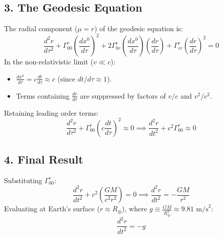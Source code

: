 \documentclass{article}
\begin{document}
	\subsection*{3. The Geodesic Equation}
	The radial component ($\mu = r$) of the geodesic equation is:
	\begin{equation}
		\frac{d^2 r}{d\tau^2} + \Gamma^r_{00} \left(\frac{dx^0}{d\tau}\right)^2 + 2\Gamma^r_{0r} \left(\frac{dx^0}{d\tau}\right)\left(\frac{dr}{d\tau}\right) + \Gamma^r_{rr}\left(\frac{dr}{d\tau}\right)^2 = 0
	\end{equation}
	In the non-relativistic limit ($v \ll c$):
	\begin{itemize}
		\item $\frac{dx^0}{d\tau} = c \frac{dt}{d\tau} \approx c$ (since $dt/d\tau \approx 1$).
		\item Terms containing $\frac{dr}{d\tau}$ are suppressed by factors of $v/c$ and $v^2/c^2$.
	\end{itemize}
	Retaining leading order terms:
	\begin{equation}
		\frac{d^2 r}{d\tau^2} + \Gamma^r_{00} \left(c \frac{dt}{d\tau}\right)^2 \approx 0 \implies \frac{d^2 r}{dt^2} + c^2 \Gamma^r_{00} \approx 0
	\end{equation}
	
	\subsection*{4. Final Result}
	Substituting $\Gamma^r_{00}$:
	\begin{equation}
		\frac{d^2 r}{dt^2} + c^2 \left( \frac{GM}{c^2 r^2} \right) = 0 \implies \frac{d^2 r}{dt^2} = -\frac{GM}{r^2}
	\end{equation}
	Evaluating at Earth's surface ($r \approx R_\oplus$), where $g \equiv \frac{GM}{R_\oplus^2} \approx 9.81 \text{ m/s}^2$:
	\begin{equation}
		\frac{d^2 r}{dt^2} = -g
	\end{equation}
	
\end{document}
